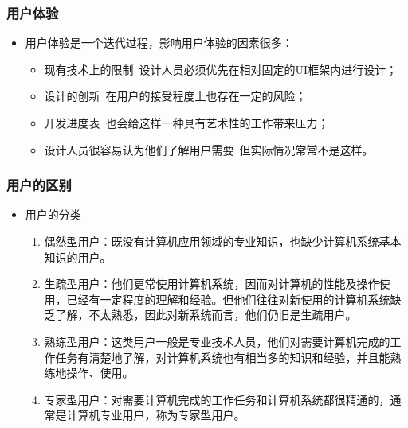 \documentclass{beamer}
\begin{document}
\begin{frame}
	\frametitle{用户体验}
	\beamertemplatetransparentcovereddynamicmedium
	\begin{itemize}[<+->]
		\item 用户体验是一个迭代过程，影响用户体验的因素很多：
		\begin{itemize}
			\item 现有技术上的限制~{\tiny 设计人员必须优先在相对固定的UI框架内进行设计；}
			\item 设计的创新~{\tiny 在用户的接受程度上也存在一定的风险；}
			\item 开发进度表~{\tiny 也会给这样一种具有艺术性的工作带来压力；}
			\item 设计人员很容易认为他们了解用户需要~{\tiny 但实际情况常常不是这样。}
		\end{itemize}
	\end{itemize}
\end{frame}

\begin{frame}
	\frametitle{用户的区别}
	\beamertemplatetransparentcovereddynamicmedium
	\begin{itemize}[<+->]
		\item 用户的分类
		\begin{enumerate}
			\item 偶然型用户：{\tiny 既没有计算机应用领域的专业知识，也缺少计算机系统基本知识的用户。}
			\item 生疏型用户：{\tiny 他们更常使用计算机系统，因而对计算机的性能及操作使用，已经有一定程度的理解和经验。但他们往往对新使用的计算机系统缺乏了解，不太熟悉，因此对新系统而言，他们仍旧是生疏用户。}
			\item 熟练型用户：{\tiny 这类用户一般是专业技术人员，他们对需要计算机完成的工作任务有清楚地了解，对计算机系统也有相当多的知识和经验，并且能熟练地操作、使用。}
			\item 专家型用户：{\tiny 对需要计算机完成的工作任务和计算机系统都很精通的，通常是计算机专业用户，称为专家型用户。}
		\end{enumerate}
	\end{itemize}
\end{frame}
\end{document}
